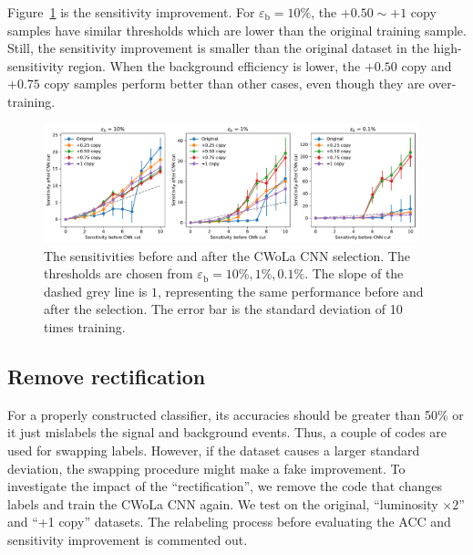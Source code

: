 \documentclass[12pt]{article}
\begin{document}
		Figure~\ref{fig:sensitivity_improvement_bkg_eff_copy_ratio} is the sensitivity improvement. For $\varepsilon_{\text{b}} = 10\%$, the $+ 0.50 \sim +1$ copy samples have similar thresholds which are lower than the original training sample. Still, the sensitivity improvement is smaller than the original dataset in the high-sensitivity region. When the background efficiency is lower, the $+ 0.50$ copy and $+ 0.75$ copy samples perform better than other cases, even though they are over-training. 
		\begin{figure}[htpb]
			\centering
			\includegraphics[width=0.97\textwidth]{HVmodel_sensitivity_improvement_bkg_eff_copy_ratio.pdf}
			\caption{The sensitivities before and after the CWoLa CNN selection. The thresholds are chosen from $\varepsilon_{\text{b}} = 10\%, 1\%, 0.1\%$. The slope of the dashed grey line is $1$, representing the same performance before and after the selection. The error bar is the standard deviation of 10 times training.}
			\label{fig:sensitivity_improvement_bkg_eff_copy_ratio}
		\end{figure}
	\subsection{Remove rectification}%
	\label{sub:remove_rectification}
		For a properly constructed classifier, its accuracies should be greater than 50\% or it just mislabels the signal and background events.	Thus, a couple of codes are used for swapping labels. However, if the dataset causes a larger standard deviation, the swapping procedure might make a fake improvement. To investigate the impact of the ``rectification'', we remove the code that changes labels and train the CWoLa CNN again. We test on the original, ``luminosity $\times 2$'' and ``+1 copy'' datasets. The relabeling process before evaluating the ACC and sensitivity improvement is commented out.
\end{document}

